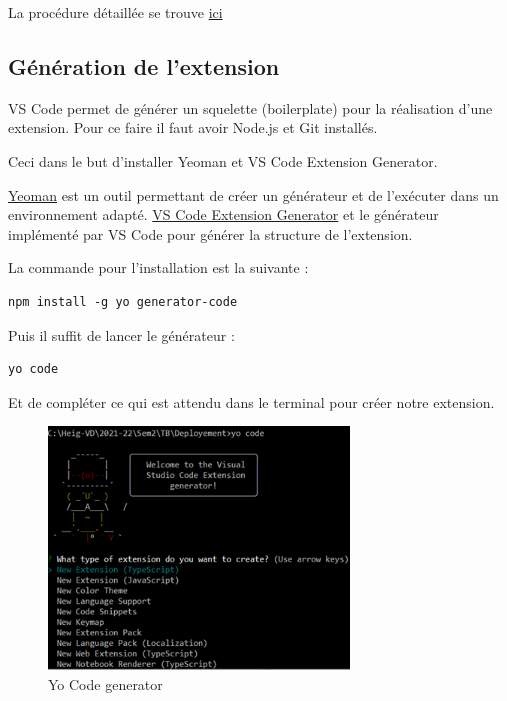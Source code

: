 \documentclass[
    iict, %
    il, %
]{heig-tb}
\begin{document}
La procédure détaillée se trouve \href{https://code.visualstudio.com/api/get-started/your-first-extension
}{ici}

\subsection{Génération de l'extension}

VS Code permet de générer un squelette (boilerplate) pour la réalisation d'une extension.
Pour ce faire il faut avoir Node.js et Git installés.

Ceci dans le but d'installer Yeoman et VS Code Extension Generator.

\href{https://yeoman.io/}{Yeoman} est un outil permettant de créer un générateur et de l'exécuter dans un environnement adapté.
\href{https://www.npmjs.com/package/generator-code}{VS Code Extension Generator} et le générateur implémenté par VS Code pour générer la structure de l'extension.

La commande pour l'installation est la suivante :

\begin{lstlisting}[frame=single,caption={generator-code},label={generator-code}]
npm install -g yo generator-code
\end{lstlisting}

Puis il suffit de lancer le générateur :

\begin{lstlisting}[frame=single]
yo code
\end{lstlisting}

Et de compléter ce qui est attendu dans le terminal pour créer notre extension.

\begin{figure}[!h]
    \begin{center}
        \includegraphics[width=8cm]{assets/figures/yo-code.png}
    \end{center}
    \caption[Yo Code generator]{\label{yo-code}Yo Code generator}
\end{figure}
\end{document}
